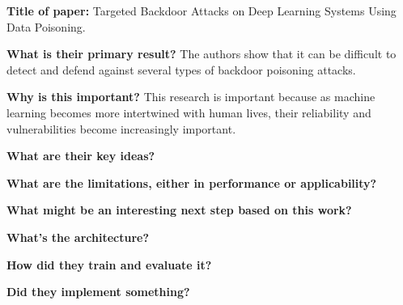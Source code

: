 \noindent \textbf{Title of paper:} Targeted Backdoor Attacks on Deep Learning
Systems Using Data Poisoning.

\noindent\textbf{What is their primary result?} The authors show that it
can be difficult to detect and defend against several types of backdoor
poisoning attacks.

\noindent\textbf{Why is this important?} This research is important
because as machine learning becomes more intertwined with human lives, their
reliability and vulnerabilities become increasingly important.

\noindent\textbf{What are their key ideas?}

\noindent\textbf{What are the limitations, either in performance or
  applicability?}

\noindent\textbf{What might be an interesting next step based on this work?}

\noindent\textbf{What's the architecture?}

\noindent\textbf{How did they train and evaluate it?}

\noindent\textbf{Did they implement something?}


